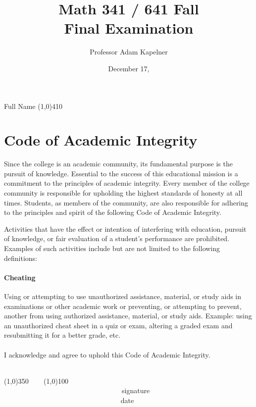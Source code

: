 \documentclass[12pt]{article}
\title{Math 341 / 641 Fall \the\year{} \\ Final Examination}
\author{Professor Adam Kapelner}
\date{December 17, \the\year{}}
\begin{document}
\maketitle

\noindent Full Name \line(1,0){410}

\thispagestyle{empty}

\section*{Code of Academic Integrity}

\footnotesize
Since the college is an academic community, its fundamental purpose is the pursuit of knowledge. Essential to the success of this educational mission is a commitment to the principles of academic integrity. Every member of the college community is responsible for upholding the highest standards of honesty at all times. Students, as members of the community, are also responsible for adhering to the principles and spirit of the following Code of Academic Integrity.

Activities that have the effect or intention of interfering with education, pursuit of knowledge, or fair evaluation of a student's performance are prohibited. Examples of such activities include but are not limited to the following definitions:

\paragraph{Cheating} Using or attempting to use unauthorized assistance, material, or study aids in examinations or other academic work or preventing, or attempting to prevent, another from using authorized assistance, material, or study aids. Example: using an unauthorized cheat sheet in a quiz or exam, altering a graded exam and resubmitting it for a better grade, etc.\\
\\
\noindent I acknowledge and agree to uphold this Code of Academic Integrity. \\~\\

\begin{center}
\line(1,0){350} ~~~ \line(1,0){100}\\
~~~~~~~~~~~~~~~~~~~~~~~~~~~~~~~~~~signature~~~~~~~~~~~~~~~~~~~~~~~~~~~~~~~~~~~~~~~~~~~~~~~~~~~~~~~~~~~~~~ date
\end{center}

\normalsize
\end{document}
